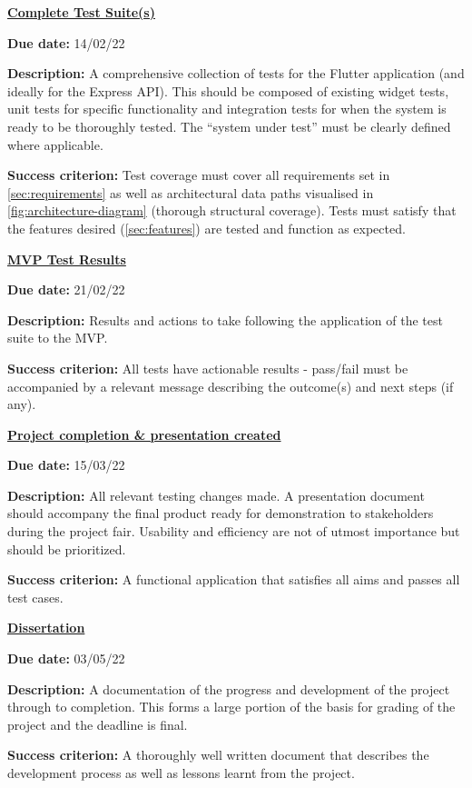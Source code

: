 \textbf{\underline{Complete Test Suite(s)}}
\par
\textbf{Due date:} 14/02/22
\par
\vspace{-3mm}
\textbf{Description:} A comprehensive collection of tests for the Flutter application (and ideally for the Express API).
This should be composed of existing widget tests, unit tests for specific functionality and
integration tests for when the system is ready to be thoroughly tested. The ``system under test'' must be clearly defined where applicable.
\par
\vspace{-3mm}
\textbf{Success criterion:} Test coverage must cover all requirements set in \cref{sec:requirements} as well as architectural data paths
visualised in \cref{fig:architecture-diagram} (thorough structural coverage). Tests must satisfy that the features desired (\cref{sec:features}) are
tested and function as expected.
\par

\textbf{\underline{MVP Test Results}}
\par
\textbf{Due date:} 21/02/22
\par
\vspace{-3mm}
\textbf{Description:} Results and actions to take following the application of the test suite to the MVP.
\par
\vspace{-3mm}
\textbf{Success criterion:} All tests have actionable results - pass/fail must be accompanied by a relevant message describing
the outcome(s) and next steps (if any).
\par

\textbf{\underline{Project completion \& presentation created}}
\par
\textbf{Due date:} 15/03/22
\par
\vspace{-3mm}
\textbf{Description:} All relevant testing changes made. A presentation document should accompany the final product ready for demonstration
to stakeholders during the project fair. Usability and efficiency are not of utmost importance but should be prioritized.
\par
\vspace{-3mm}
\textbf{Success criterion:} A functional application that satisfies all aims and passes all test cases.
\par
\pagebreak

\textbf{\underline{Dissertation}}
\par
\textbf{Due date:} 03/05/22
\par
\vspace{-3mm}
\textbf{Description:} A documentation of the progress and development of the project through to completion. This forms a large portion of the basis
for grading of the project and the deadline is final.
\par
\vspace{-3mm}
\textbf{Success criterion:} A thoroughly well written document that describes the development process as well as lessons learnt from the project.

